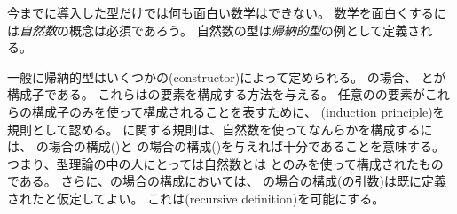 \documentclass[index]{subfiles}
\begin{document}

今までに導入した型だけでは何も面白い数学はできない。
数学を面白くするには\emph{自然数}の概念は必須であろう。
自然数の型は\emph{帰納的型}の例として定義される。



一般に帰納的型はいくつかの(constructor)によって定められる。
\myInlineMath{\myNat}の場合、
\myInlineMath{\myNatZero}とが構成子である。
これらは\myInlineMath{\myNat}の要素を構成する方法を与える。
任意の\myInlineMath{\myNat}の要素がこれらの構成子のみを使って構成されることを表すために、
(induction principle)を規則として認める。
に関する規則は、自然数を使ってなんらかを構成するには、
\myInlineMath{\myNatZero}の場合の構成()と
の場合の構成()を与えれば十分であることを意味する。
つまり、型理論の中の人にとっては自然数とは
\myInlineMath{\myNatZero}とのみを使って構成されたものである。
さらに、の場合の構成においては、
の場合の構成(の引数)は既に定義されたと仮定してよい。
これは(recursive definition)を可能にする。




\end{document}
